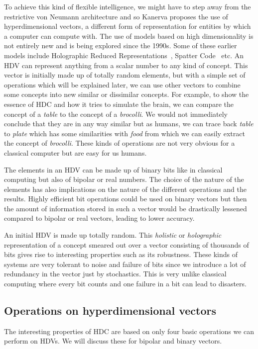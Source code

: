 To achieve this kind of flexible intelligence, we might have to step away from the restrictive von Neumann architecture and so Kanerva proposes the use of hyperdimensional vectors, a different form of representation for entities by which a computer can compute with. The use of models based on high dimensionality is not entirely new and is being explored since the 1990s. Some of these earlier models include Holographic Reduced Representations~\cite{HRR}, Spatter Code~\cite{spatter} etc. An HDV can represent anything from a scalar number to any kind of concept. This vector is initially made up of totally random elements, but with a simple set of operations which will be explained later, we can use other vectors to combine some concepts into new similar or dissimilar concepts. For example, to show the essence of HDC and how it tries to simulate the brain, we can compare the concept of a \textit{table} to the concept of a \textit{brocolli}. We would not immediately conclude that they are in any way similar but as humans, we can trace back \textit{table} to \textit{plate} which has some similarities with \textit{food} from which we can easily extract the concept of \textit{brocolli}. These kinds of operations are not very obvious for a classical computer but are easy for us humans. 

The elements in an HDV can be made up of binary bits like in classical computing but also of bipolar or real numbers. The choice of the nature of the elements has also implications on the nature of the different operations and the results. Highly efficient bit operations could be used on binary vectors but then the amount of information stored in such a vector would be drastically lessened compared to bipolar or real vectors, leading to lower accuracy.  

An initial HDV is made up totally random. This \textit{holistic} or \textit{holographic} representation of a concept smeared out over a vector consisting of thousands of bits gives rise to interesting properties such as its robustness. These kinds of systems are very tolerant to noise and failure of bits since we introduce a lot of redundancy in the vector just by stochastics. This is very unlike classical computing where every bit counts and one failure in a bit can lead to disasters. 
\subsection{Operations on hyperdimensional vectors}
The interesting properties of HDC are based on only four basic operations we can perform on HDVs. We will discuss these for bipolar and binary vectors.
